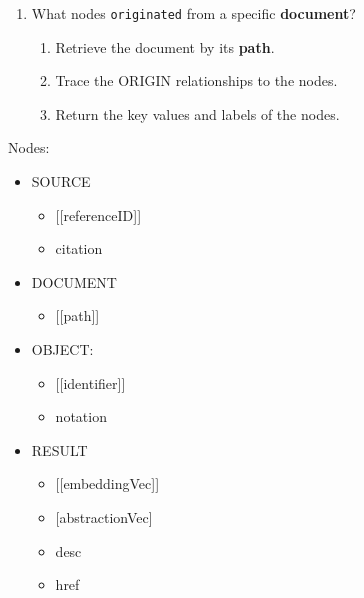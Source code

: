 \documentclass[
  british,
]{article}
\providecommand{\tightlist}{%
  \setlength{\itemsep}{0pt}\setlength{\parskip}{0pt}}
\begin{document}
\begin{enumerate}
  \begin{enumerate}
  \def\labelenumii{\arabic{enumii}.}
  \tightlist
  \item
    Retrieve the specific object by its \textbf{name}.
  \item
    Trace the composed DEFINE, REQUIRE and APPLY relationships to
    objects.
  \item
    Return the \textbf{names} of the objects.
  \end{enumerate}
\item
  What nodes \texttt{originated} from a specific \textbf{document}?

  \begin{enumerate}
  \def\labelenumii{\arabic{enumii}.}
  \tightlist
  \item
    Retrieve the document by its \textbf{path}.
  \item
    Trace the ORIGIN relationships to the nodes.
  \item
    Return the key values and labels of the nodes.
  \end{enumerate}
\end{enumerate}

Nodes:

\begin{itemize}
\tightlist
\item
  SOURCE

  \begin{itemize}
  \tightlist
  \item
    {[}{[}referenceID{]}{]}
  \item
    citation
  \end{itemize}
\item
  DOCUMENT

  \begin{itemize}
  \tightlist
  \item
    {[}{[}path{]}{]}
  \end{itemize}
\item
  OBJECT:

  \begin{itemize}
  \tightlist
  \item
    {[}{[}identifier{]}{]}
  \item
    notation
  \end{itemize}
\item
  RESULT

  \begin{itemize}
  \tightlist
  \item
    {[}{[}embeddingVec{]}{]}
  \item
    {[}abstractionVec{]}
  \item
    desc
  \item
    href
  \end{itemize}
\end{itemize}
\end{document}
